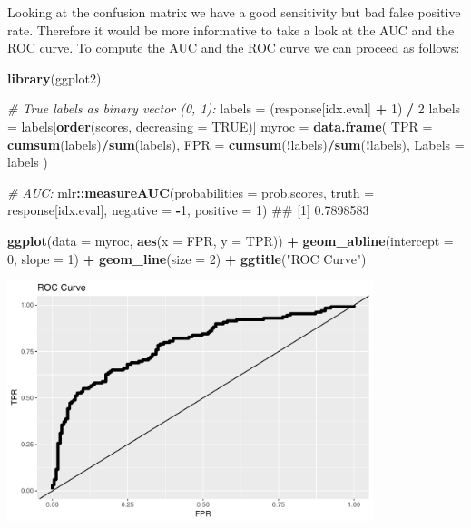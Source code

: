 \documentclass[]{article}
\newenvironment{Shaded}{\begin{snugshade}}{\end{snugshade}}
\newcommand{\KeywordTok}[1]{\textcolor[rgb]{0.13,0.29,0.53}{\textbf{#1}}}
\newcommand{\DataTypeTok}[1]{\textcolor[rgb]{0.13,0.29,0.53}{#1}}
\newcommand{\DecValTok}[1]{\textcolor[rgb]{0.00,0.00,0.81}{#1}}
\newcommand{\StringTok}[1]{\textcolor[rgb]{0.31,0.60,0.02}{#1}}
\newcommand{\CommentTok}[1]{\textcolor[rgb]{0.56,0.35,0.01}{\textit{#1}}}
\newcommand{\OtherTok}[1]{\textcolor[rgb]{0.56,0.35,0.01}{#1}}
\newcommand{\OperatorTok}[1]{\textcolor[rgb]{0.81,0.36,0.00}{\textbf{#1}}}
\newcommand{\NormalTok}[1]{#1}
\begin{document}
Looking at the confusion matrix we have a good sensitivity but bad false
positive rate. Therefore it would be more informative to take a look at
the AUC and the ROC curve. To compute the AUC and the ROC curve we can
proceed as follows:

\begin{Shaded}
\begin{Highlighting}[]
\KeywordTok{library}\NormalTok{(ggplot2)}

\CommentTok{# True labels as binary vector (0, 1):}
\NormalTok{labels =}\StringTok{ }\NormalTok{(response[idx.eval] }\OperatorTok{+}\StringTok{ }\DecValTok{1}\NormalTok{) }\OperatorTok{/}\StringTok{ }\DecValTok{2}
\NormalTok{labels =}\StringTok{ }\NormalTok{labels[}\KeywordTok{order}\NormalTok{(scores, }\DataTypeTok{decreasing =} \OtherTok{TRUE}\NormalTok{)]}
\NormalTok{myroc =}\StringTok{ }\KeywordTok{data.frame}\NormalTok{(}
  \DataTypeTok{TPR =} \KeywordTok{cumsum}\NormalTok{(labels)}\OperatorTok{/}\KeywordTok{sum}\NormalTok{(labels), }
  \DataTypeTok{FPR =} \KeywordTok{cumsum}\NormalTok{(}\OperatorTok{!}\NormalTok{labels)}\OperatorTok{/}\KeywordTok{sum}\NormalTok{(}\OperatorTok{!}\NormalTok{labels), }
  \DataTypeTok{Labels =}\NormalTok{ labels}
\NormalTok{)}

\CommentTok{# AUC:}
\NormalTok{mlr}\OperatorTok{::}\KeywordTok{measureAUC}\NormalTok{(}\DataTypeTok{probabilities =}\NormalTok{ prob.scores, }\DataTypeTok{truth =}\NormalTok{ response[idx.eval], }
  \DataTypeTok{negative =} \OperatorTok{-}\DecValTok{1}\NormalTok{, }\DataTypeTok{positive =} \DecValTok{1}\NormalTok{)}
\NormalTok{## [1] 0.7898583}

\KeywordTok{ggplot}\NormalTok{(}\DataTypeTok{data =}\NormalTok{ myroc, }\KeywordTok{aes}\NormalTok{(}\DataTypeTok{x =}\NormalTok{ FPR, }\DataTypeTok{y =}\NormalTok{ TPR)) }\OperatorTok{+}
\StringTok{  }\KeywordTok{geom_abline}\NormalTok{(}\DataTypeTok{intercept =} \DecValTok{0}\NormalTok{, }\DataTypeTok{slope =} \DecValTok{1}\NormalTok{) }\OperatorTok{+}
\StringTok{  }\KeywordTok{geom_line}\NormalTok{(}\DataTypeTok{size =} \DecValTok{2}\NormalTok{) }\OperatorTok{+}
\StringTok{  }\KeywordTok{ggtitle}\NormalTok{(}\StringTok{"ROC Curve"}\NormalTok{)}
\end{Highlighting}
\end{Shaded}

\begin{center}\includegraphics[width=0.8\textwidth]{usecase_pdf_files/figure-latex/unnamed-chunk-24-1} \end{center}
\end{document}
